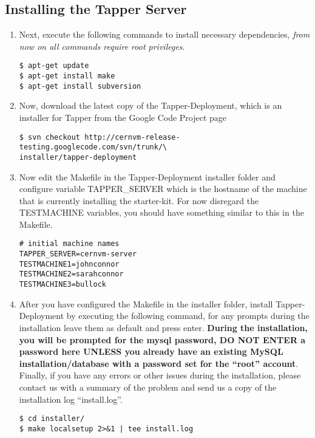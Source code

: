 \subsection{Installing the Tapper Server}
\begin{enumerate}
\item 	Next, execute the following commands to install necessary dependencies, \emph{from now on all commands require root privileges}.

\lstset{language=bash,caption= Install Dependencies}
\begin{lstlisting}
$ apt-get update
$ apt-get install make
$ apt-get install subversion
\end{lstlisting}

\item 	Now, download the latest copy of the Tapper-Deployment, which is an installer for Tapper from the \cernvmreleasetesting 
		Google Code Project page

\lstset{language=bash,caption= Download Tapper-Deployment}
\begin{lstlisting}
$ svn checkout http://cernvm-release-testing.googlecode.com/svn/trunk/\
installer/tapper-deployment
\end{lstlisting}

\item 	Now edit the Makefile in the Tapper-Deployment installer folder and configure variable TAPPER\_SERVER which 
		is the hostname of the machine that is currently installing the starter-kit. For now disregard the TESTMACHINE 
		variables, you should have something similar to this in the Makefile.

\lstset{language=bash,caption= Makefile Configuration}
\begin{lstlisting}
# initial machine names
TAPPER_SERVER=cernvm-server
TESTMACHINE1=johnconnor
TESTMACHINE2=sarahconnor
TESTMACHINE3=bullock
\end{lstlisting}

\item	After you have configured the Makefile in the installer folder, install Tapper-Deployment by executing the
		following command, for any prompts during the installation leave them as default and press enter. {\bf During
		the installation, you will be prompted for the mysql password, DO NOT ENTER a password here UNLESS you already have an
		existing MySQL installation/database with a password set for the ``root'' account}. Finally, if you have any errors or
		other issues during the installation, please contact us with a summary of the problem and send us a copy of the installation 
		log ``install.log''.

\lstset{language=bash,caption= Install Tapper-Deployment}
\begin{lstlisting}
$ cd installer/
$ make localsetup 2>&1 | tee install.log
\end{lstlisting}
\end{enumerate}


